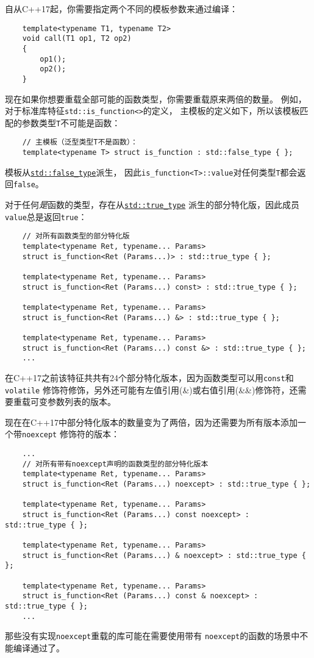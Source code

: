 自从C++17起，你需要指定两个不同的模板参数来通过编译：
\begin{lstlisting}
    template<typename T1, typename T2>
    void call(T1 op1, T2 op2)
    {
        op1();
        op2();
    }
\end{lstlisting}
现在如果你想要重载全部可能的函数类型，你需要重载原来两倍的数量。
例如，对于标准库特征\texttt{std::is\_function<>}的定义，
主模板的定义如下，所以该模板匹配的参数类型\texttt{T}不可能是函数：
\begin{lstlisting}
    // 主模板（泛型类型T不是函数）：
    template<typename T> struct is_function : std::false_type { };
\end{lstlisting}
模板从\hyperref[ch33.2]{\texttt{std::false\_type}}派生，
因此\texttt{is\_function<T>::value}对任何类型\texttt{T}都会返回\texttt{false}。

对于任何\emph{是}函数的类型，存在从\hyperref[ch33.2]{\texttt{std::true\_type}}
派生的部分特化版，因此成员\texttt{value}总是返回\texttt{true}：
\begin{lstlisting}
    // 对所有函数类型的部分特化版
    template<typename Ret, typename... Params>
    struct is_function<Ret (Params...)> : std::true_type { };

    template<typename Ret, typename... Params>
    struct is_function<Ret (Params...) const> : std::true_type { };

    template<typename Ret, typename... Params>
    struct is_function<Ret (Params...) &> : std::true_type { };

    template<typename Ret, typename... Params>
    struct is_function<Ret (Params...) const &> : std::true_type { };
    ...
\end{lstlisting}
在C++17之前该特征共共有24个部分特化版本，因为函数类型可以用\texttt{const}和\texttt{volatile}
修饰符修饰，另外还可能有左值引用(\&)或右值引用(\&\&)修饰符，还需要重载可变参数列表的版本。

现在在C++17中部分特化版本的数量变为了两倍，因为还需要为所有版本添加一个带\texttt{noexcept}
修饰符的版本：
\begin{lstlisting}
    ...
    // 对所有带有noexcept声明的函数类型的部分特化版本
    template<typename Ret, typename... Params>
    struct is_function<Ret (Params...) noexcept> : std::true_type { };

    template<typename Ret, typename... Params>
    struct is_function<Ret (Params...) const noexcept> : std::true_type { };

    template<typename Ret, typename... Params>
    struct is_function<Ret (Params...) & noexcept> : std::true_type { };

    template<typename Ret, typename... Params>
    struct is_function<Ret (Params...) const & noexcept> : std::true_type { };
    ...
\end{lstlisting}
那些没有实现\texttt{noexcept}重载的库可能在需要使用带有
\texttt{noexcept}的函数的场景中不能编译通过了。

